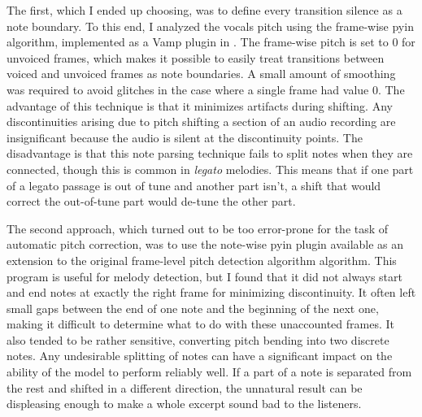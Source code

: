 The first, which I ended up choosing, was to define every transition silence as a note boundary. To this end, I analyzed the vocals pitch using the frame-wise \gls{pyin} algorithm, implemented as a Vamp plugin in \cite{cannam2010sonic}. The frame-wise pitch is set to 0 for unvoiced frames, which makes it possible to easily treat transitions between voiced and unvoiced frames as note boundaries. A small amount of smoothing was required to avoid glitches in the case where a single frame had value 0. The advantage of this technique is that it minimizes artifacts during shifting. Any discontinuities arising due to pitch shifting a section of an audio recording are insignificant because the audio is silent at the discontinuity points. The disadvantage is that this note parsing technique fails to split notes when they are connected, though this is common in \textit{legato} melodies. This means that if one part of a legato passage is out of tune and another part isn't, a shift that would correct the out-of-tune part would de-tune the other part.

The second approach, which turned out to be too error-prone for the task of automatic pitch correction, was to use the note-wise \gls{pyin} plugin available as an extension to the original frame-level pitch detection algorithm algorithm. This program is useful for melody detection, but I found that it did not always start and end notes at exactly the right frame for minimizing discontinuity. It often left small gaps between the end of one note and the beginning of the next one, making it difficult to determine what to do with these unaccounted frames. It also tended to be rather sensitive, converting pitch bending into two discrete notes. Any undesirable splitting of notes can have a significant impact on the ability of the model to perform reliably well. If a part of a note is separated from the rest and shifted in a different direction, the unnatural result can be displeasing enough to make a whole excerpt sound bad to the listeners.

